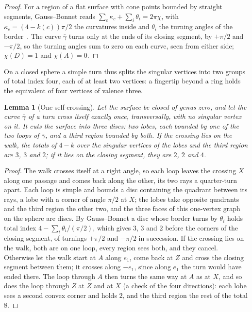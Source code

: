 \documentclass[11pt,a4paper]{article}
\newtheorem{lemma}{Lemma}
\newcommand{\lean}[1]{\texttt{\detokenize{#1}}}
\newenvironment{evidence}[3][]{}{}
\begin{document}
\begin{proof}
For a region of a flat surface with cone points bounded by straight segments,
Gauss--Bonnet reads $\sum_c \kappa_c + \sum_i \theta_i = 2\pi\chi$, with
$\kappa_c = (4 - k(c))\pi/2$ the curvatures inside and $\theta_i$ the turning
angles of the border~\cite{bommes2013survey}. The curve $\bar\gamma$ turns
only at the ends of its closing segment, by $+\pi/2$ and $-\pi/2$, so the
turning angles sum to zero on each curve, seen from either side; $\chi(D) = 1$
and $\chi(A) = 0$.
\end{proof}

On a closed sphere a simple turn thus splits the singular vertices into two
groups of total index four, each of at least two vertices: a fingertip beyond
a ring holds the equivalent of four vertices of valence three.

\begin{evidence}{core}{\lean{one_crossing_on_walk}, \lean{one_crossing_on_segment}; tested: 42 self-crossings on the spheres of 50 random instances; assumed: the regions cut at the crossing are discs, and which of their corners are convex}
\begin{lemma}[One self-crossing]\label{lem:eight}
Let the surface be closed of genus zero, and let the curve $\bar\gamma$ of a
turn cross itself exactly once, transversally, with no singular vertex on it.
It cuts the surface into three discs: two \emph{lobes}, each bounded by one of
the two loops of $\bar\gamma$, and a third region bounded by both. If the
crossing lies on the walk, the totals of $4 - k$ over the singular vertices of
the lobes and the third region are $3$, $3$ and $2$; if it lies on the closing
segment, they are $2$, $2$ and $4$.
\end{lemma}
\end{evidence}

\begin{proof}
The walk crosses itself at a right angle, so each loop leaves the crossing
$X$ along one passage and comes back along the other, its two rays a
quarter-turn apart. Each loop is simple and bounds a disc containing the
quadrant between its rays, a lobe with a corner of angle $\pi/2$ at $X$; the
lobes take opposite quadrants and the third region the other two, and the
three faces of this one-vertex graph on the sphere are discs. By
Gauss--Bonnet a disc whose border turns by $\theta_i$ holds total index $4 -
\sum_i \theta_i/(\pi/2)$, which gives $3$, $3$ and $2$ before the corners of
the closing segment, of turnings $+\pi/2$ and $-\pi/2$ in succession. If the
crossing lies on the walk, both are on one loop, every region sees both, and
they cancel. Otherwise let the walk start at $A$ along $e_1$, come back at $Z$
and cross the closing segment between them; it crosses along $-e_1$, since
along $e_1$ the turn would have ended there. The loop through $A$ then turns
the same way at $A$ as at $X$, and so does the loop through $Z$ at $Z$ and at $X$ (a
check of the four directions): each lobe sees a second convex corner and holds
$2$, and the third region the rest of the total $8$.
\end{proof}
\end{document}
